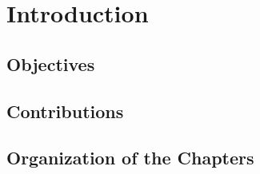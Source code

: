 \chapter{Introduction}


\section{Objectives}

\section{Contributions}


\section{Organization of the Chapters}



